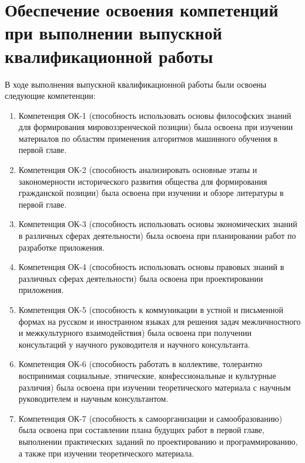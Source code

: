 \newpage
\section{\Large Обеспечение освоения компетенций при выполнении выпускной квалификационной работы}

\par
В ходе выполнения выпускной квалификационной работы были освоены 
следующие компетенции:

\begin{enumerate} 
  \item Компетенция ОК-1 (способность использовать основы философских знаний для формирования мировоззренческой позиции) была освоена при изучении материалов по областям применения алгоритмов машинного обучения в первой главе.
  
  \item Компетенция ОК-2 (способность анализировать основные этапы и закономерности исторического развития общества для формирования гражданской позиции) была освоена при изучении и обзоре литературы в первой главе.
  
  \item Компетенция ОК-3 (способность использовать основы экономических знаний в различных сферах деятельности) была освоена при планировании работ по разработке приложения.
  
  \item Компетенция ОК-4 (способность использовать основы правовых знаний в различных сферах деятельности) была освоена при проектировании приложения.
  
  \item Компетенция ОК-5 (способность к коммуникации в устной и письменной формах на русском и иностранном языках для решения задач межличностного и межкультурного взаимодействия) была освоена при получении консультаций у научного руководителя и научного консультанта.
  
  \item Компетенция ОК-6 (способность работать в коллективе, толерантно воспринимая социальные, этнические, конфессиональные и культурные различия) была освоена при изучении теоретического материала с научным руководителем и научным консультантом.
  
  \item Компетенция ОК-7 (способность к самоорганизации и самообразованию) была освоена при составлении плана будущих работ в первой главе, выполнении практических заданий по 
проектированию и программированию, а также при изучении теоретического материала.
  

\end{enumerate}
